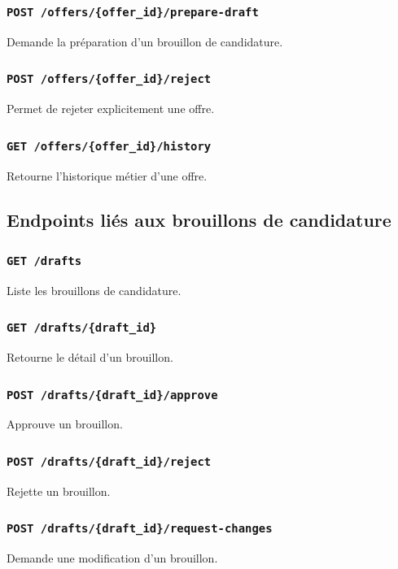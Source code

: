 \documentclass[11pt,a4paper]{article}
\begin{document}
\subsubsection{\texttt{POST /offers/\{offer\_id\}/prepare-draft}}
Demande la préparation d’un brouillon de candidature.

\subsubsection{\texttt{POST /offers/\{offer\_id\}/reject}}
Permet de rejeter explicitement une offre.

\subsubsection{\texttt{GET /offers/\{offer\_id\}/history}}
Retourne l’historique métier d’une offre.

\subsection{Endpoints liés aux brouillons de candidature}

\subsubsection{\texttt{GET /drafts}}
Liste les brouillons de candidature.

\subsubsection{\texttt{GET /drafts/\{draft\_id\}}}
Retourne le détail d’un brouillon.

\subsubsection{\texttt{POST /drafts/\{draft\_id\}/approve}}
Approuve un brouillon.

\subsubsection{\texttt{POST /drafts/\{draft\_id\}/reject}}
Rejette un brouillon.

\subsubsection{\texttt{POST /drafts/\{draft\_id\}/request-changes}}
Demande une modification d’un brouillon.
\end{document}
